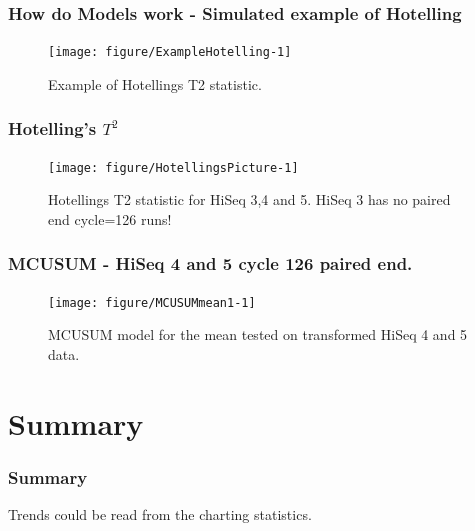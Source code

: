 \documentclass[10pt]{beamer}\usepackage[]{graphicx}\usepackage[]{color}
\newenvironment{knitrout}{}{} %
\begin{document}
\begin{frame}\frametitle{How do Models work - Simulated example of Hotelling}
\begin{knitrout}
\color{fgcolor}\begin{figure}
\texttt{[image: figure/ExampleHotelling-1]} \caption[Example of Hotellings T2 statistic]{Example of Hotellings T2 statistic.}\label{fig:ExampleHotelling}
\end{figure}


\end{knitrout}
\end{frame}


\begin{frame}\frametitle{Hotelling's $T^2$}
\begin{knitrout}
\color{fgcolor}\begin{figure}
\texttt{[image: figure/HotellingsPicture-1]} \caption[Hotellings T2 statistic for HiSeq 3,4 and 5]{Hotellings T2 statistic for HiSeq 3,4 and 5. HiSeq 3 has no paired end cycle=126 runs!}\label{fig:HotellingsPicture}
\end{figure}


\end{knitrout}
\end{frame}



\begin{frame}\frametitle{MCUSUM - HiSeq 4 and 5 cycle 126 paired end.}
\begin{knitrout}
\color{fgcolor}\begin{figure}
\texttt{[image: figure/MCUSUMmean1-1]} \caption[MCUSUM model for the mean tested on transformed HiSeq 4 and 5 data]{MCUSUM model for the mean tested on transformed HiSeq 4 and 5 data.}\label{fig:MCUSUMmean1}
\end{figure}


\end{knitrout}
\end{frame}
 
 \section{Summary}
 \begin{frame}\frametitle{Summary}
Trends could be read from the charting statistics. 
 \end{frame}
\end{document}
